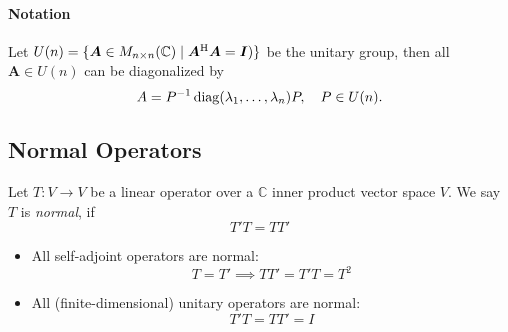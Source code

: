 \paragraph{Notation}
Let $U(n)=\{\bm A\in M_{n\times n}(\mathbb{C})\mid \bm A^{\mathrm H}\bm A=\bm I)\}$ be the unitary group, then all $\bm A\in U(n)$ can be diagonalized by 
\[
A=P^{-1}\operatorname{diag}(\lambda_1,\dots,\lambda_n)P,\quad
P\in U(n).
\]

\subsection{Normal Operators}

\begin{definition}[Normal]
Let $T:V\to V$ be a linear operator over a $\mathbb{C}$ inner product vector space $V$.
We say $T$ is \emph{normal}, if
\[
T'T=TT'
\]
\end{definition}

\begin{example}
\begin{itemize}
\item
All self-adjoint operators are normal:
\[
T=T'\implies TT'=T'T=T^2
\]
\item
All (finite-dimensional) unitary operators are normal:
\[
T'T=TT'=I
\]
\end{itemize}
\end{example}


